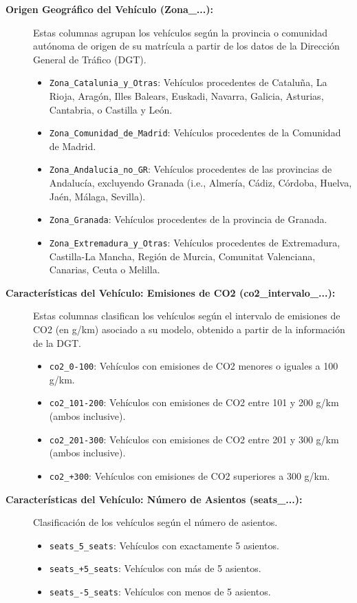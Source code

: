\begin{description}
    \item[\textbf{Origen Geográfico del Vehículo (Zona\_...):}]
    Estas columnas agrupan los vehículos según la provincia o comunidad autónoma de origen de su matrícula a partir de los datos de la Dirección General de Tráfico (DGT).
        \begin{itemize}
            \item \texttt{Zona\_Catalunia\_y\_Otras}: Vehículos procedentes de Cataluña, La Rioja, Aragón, Illes Balears, Euskadi, Navarra, Galicia, Asturias, Cantabria, o Castilla y León.
            \item \texttt{Zona\_Comunidad\_de\_Madrid}: Vehículos procedentes de la Comunidad de Madrid.
            \item \texttt{Zona\_Andalucia\_no\_GR}: Vehículos procedentes de las provincias de Andalucía, excluyendo Granada (i.e., Almería, Cádiz, Córdoba, Huelva, Jaén, Málaga, Sevilla).
            \item \texttt{Zona\_Granada}: Vehículos procedentes de la provincia de Granada.
            \item \texttt{Zona\_Extremadura\_y\_Otras}: Vehículos procedentes de Extremadura, Castilla-La Mancha, Región de Murcia, Comunitat Valenciana, Canarias, Ceuta o Melilla.
        \end{itemize}

    \item[\textbf{Características del Vehículo: Emisiones de CO2 (co2\_intervalo\_...):}]
    Estas columnas clasifican los vehículos según el intervalo de emisiones de CO2 (en g/km) asociado a su modelo, obtenido a partir de la información de la DGT.
        \begin{itemize}
            \item \texttt{co2\_0-100}: Vehículos con emisiones de CO2 menores o iguales a 100 g/km.
            \item \texttt{co2\_101-200}: Vehículos con emisiones de CO2 entre 101 y 200 g/km (ambos inclusive).
            \item \texttt{co2\_201-300}: Vehículos con emisiones de CO2 entre 201 y 300 g/km (ambos inclusive).
            \item \texttt{co2\_+300}: Vehículos con emisiones de CO2 superiores a 300 g/km.
        \end{itemize}

    \item[\textbf{Características del Vehículo: Número de Asientos (seats\_...):}]
    Clasificación de los vehículos según el número de asientos.
        \begin{itemize}
            \item \texttt{seats\_5\_seats}: Vehículos con exactamente 5 asientos.
            \item \texttt{seats\_+5\_seats}: Vehículos con más de 5 asientos.
            \item \texttt{seats\_-5\_seats}: Vehículos con menos de 5 asientos.
        \end{itemize}


\end{description}
